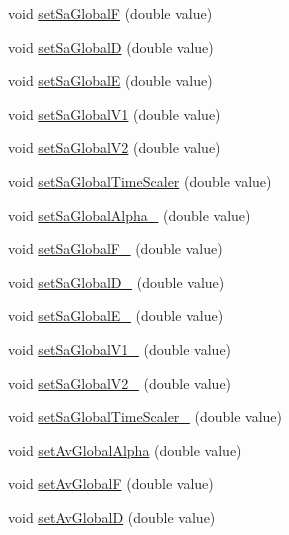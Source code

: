\begin{DoxyCompactItemize}
\item 
void \hyperlink{classatrial_parameters_a2c9c09fe672d04ac68f1356343fad669}{set\+Sa\+Global\+F} (double value)
\item 
void \hyperlink{classatrial_parameters_aee40af07411f17363ea06d6c7b40d3d3}{set\+Sa\+Global\+D} (double value)
\item 
void \hyperlink{classatrial_parameters_af51880cf3645288dddce20513a85899c}{set\+Sa\+Global\+E} (double value)
\item 
void \hyperlink{classatrial_parameters_aa14935f63b78f52f90e684e17af2e8be}{set\+Sa\+Global\+V1} (double value)
\item 
void \hyperlink{classatrial_parameters_afb57088c6955f7faa92a5f55137d661a}{set\+Sa\+Global\+V2} (double value)
\item 
void \hyperlink{classatrial_parameters_ae6ea3d79d98a9a573f69979672b99297}{set\+Sa\+Global\+Time\+Scaler} (double value)
\item 
void \hyperlink{classatrial_parameters_afe41a61763e7956fade78d2add1d6a1f}{set\+Sa\+Global\+Alpha\+\_} (double value)
\item 
void \hyperlink{classatrial_parameters_a37e9a313eac8ad8ac1a3cad56a99ea4b}{set\+Sa\+Global\+F\+\_} (double value)
\item 
void \hyperlink{classatrial_parameters_a90f67e724ae64337fe1347cf8b61db9d}{set\+Sa\+Global\+D\+\_} (double value)
\item 
void \hyperlink{classatrial_parameters_a4996b46ae8f31e1a13c3754fec4ad11b}{set\+Sa\+Global\+E\+\_} (double value)
\item 
void \hyperlink{classatrial_parameters_a7a417159e294c3a2b720e6ce362a23d0}{set\+Sa\+Global\+V1\+\_} (double value)
\item 
void \hyperlink{classatrial_parameters_ace08ad55c3eda49782c6fcd5f897f597}{set\+Sa\+Global\+V2\+\_} (double value)
\item 
void \hyperlink{classatrial_parameters_a4d3d26175f5ba0802d6fc6668fdcd6f7}{set\+Sa\+Global\+Time\+Scaler\+\_} (double value)
\item 
void \hyperlink{classatrial_parameters_a88cb4bf667199e2852f575e99730ea0f}{set\+Av\+Global\+Alpha} (double value)
\item 
void \hyperlink{classatrial_parameters_ae6a6825493988fbacb12e1bd570651ef}{set\+Av\+Global\+F} (double value)
\item 
void \hyperlink{classatrial_parameters_aca462126cc7e8b71fb9c3cf02a24face}{set\+Av\+Global\+D} (double value)
\item 

\end{DoxyCompactItemize}
